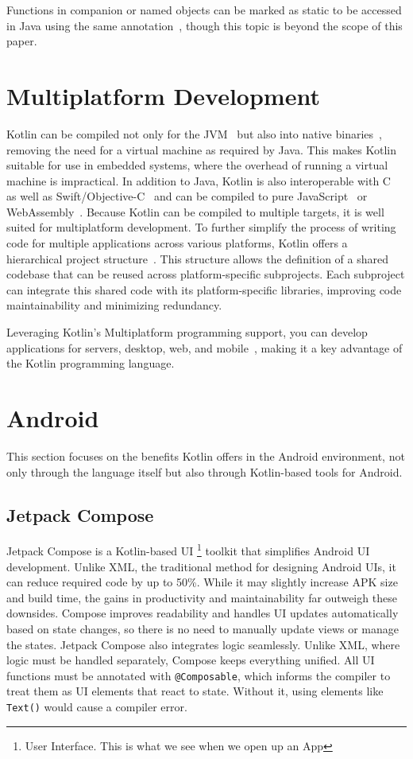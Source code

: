 \documentclass[a4paper,11pt]{article}
\begin{document}
Functions in companion or named objects can be marked as static to be accessed in Java using the same annotation~\cite{interop-static-fields}, though this topic is beyond the scope of this paper.

\section{Multiplatform Development}
Kotlin can be compiled not only for the JVM~\cite{multi-interopJava} but also into native binaries~\cite{multi-kotlinNative}, removing the need for a virtual machine as required by Java. This makes Kotlin suitable for use in embedded systems, where the overhead of running a virtual machine is impractical. In addition to Java, Kotlin is also interoperable with C~\cite{multi-interopC} as well as Swift/Objective-C~\cite{multi-interopObjC} and can be compiled to pure JavaScript~\cite{multi-kotlinJS} or WebAssembly~\cite{multi-webass}. Because Kotlin can be compiled to multiple targets, it is well suited for multiplatform development. To further simplify the process of writing code for multiple applications across various platforms, Kotlin offers a hierarchical project structure~\cite{multi-structure,multi}. This structure allows the definition of a shared codebase that can be reused across platform-specific subprojects. Each subproject can integrate this shared code with its platform-specific libraries, improving code maintainability and minimizing redundancy.

Leveraging Kotlin's Multiplatform programming support, you can develop applications for servers, desktop, web, and mobile~\cite{multi}, making it a key advantage of the Kotlin programming language. 

\section{Android}
This section focuses on the benefits Kotlin offers in the Android environment, not only through the language itself but also through Kotlin-based tools for Android.

\subsection{Jetpack Compose}\label{sec:jetpack}
Jetpack Compose is a Kotlin-based UI \footnote{User Interface. This is what we see when we open up an App} toolkit that simplifies Android UI development. Unlike XML, the traditional method for designing Android UIs, it can reduce required code by up to 50\%. While it may slightly increase APK size and build time, the gains in productivity and maintainability far outweigh these downsides.
Compose improves readability and handles UI updates automatically based on state changes, so there is no need to manually update views or manage the states.
Jetpack Compose also integrates logic seamlessly. Unlike XML, where logic must be handled separately, Compose keeps everything unified.
All UI functions must be annotated with \texttt{@Composable}, which informs the compiler to treat them as UI elements that react to state. Without it, using elements like \texttt{Text()} would cause a compiler error.
\end{document}
